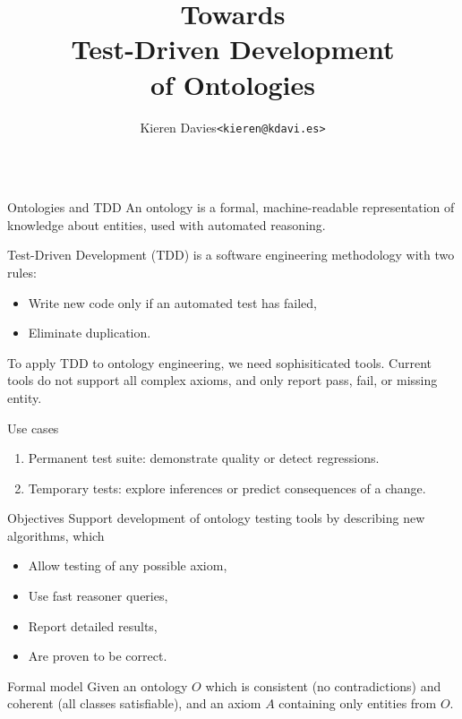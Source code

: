 \documentclass[final,fleqn]{beamer}
\title{Towards\\Test-Driven Development\\of Ontologies}
\author{Kieren Davies\hspace{0.5em}\nolinkurl{<kieren@kdavi.es>}}
\institute{%
  Department of Computer Science \\
  University of Cape Town
}
\begin{document}
\begin{frame}{}

\begin{columns}[onlytextwidth]
  \begin{column}{.45\linewidth}
    \begin{minipage}[t][.65\paperheight][s]{\columnwidth}
      \begin{block}{Ontologies and TDD}
        \justifying
        \setlength{\parskip}{1ex}\vspace{-1ex}
        An ontology is a formal, machine-readable representation of knowledge about entities, used with automated reasoning.

        Test-Driven Development (TDD) is a software engineering methodology with two rules:
        \vspace{-1ex}
        \begin{itemize}
          \item Write new code only if an automated test has failed,
          \item Eliminate duplication.
        \end{itemize}

        To apply TDD to ontology engineering, we need sophisiticated tools.
        Current tools do not support all complex axioms, and only report pass, fail, or missing entity.
      \end{block}
      \vfill
      \begin{block}{Use cases\phantom{y}}
        \begin{enumerate}
          \item Permanent test suite: demonstrate quality or detect regressions.
          \item Temporary tests: explore inferences or predict consequences of a change.
        \end{enumerate}
      \end{block}
      \vfill
      \begin{block}{Objectives}
        Support development of ontology testing tools by describing new algorithms, which
        \begin{itemize}
          \item Allow testing of any possible axiom,
          \item Use fast reasoner queries,
          \item Report detailed results,
          \item Are proven to be correct.
        \end{itemize}
      \end{block}
      \vfill
      \begin{block}{Formal model\phantom{y}}
        \setlength{\parskip}{1ex}\vspace{-1ex}
        Given an ontology $O$ which is consistent (no contradictions) and coherent (all classes satisfiable), and an axiom $A$ containing only entities from $O$.


\end{block}
\end{minipage}
\end{column}
\end{columns}
\end{frame}
\end{document}
